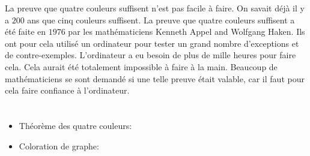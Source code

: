 {{La preuve que quatre couleurs suffisent n’est pas facile à faire. On savait déjà il y a $200$ ans que cinq couleurs suffisent. La preuve que quatre couleurs suffisent a été faite en $1976$ par les mathématiciens Kenneth Appel and Wolfgang Haken. Ils ont pour cela utilisé un ordinateur pour tester un grand nombre d’exceptions et de contre-exemples. L’ordinateur a eu besoin de plus de mille heures pour faire cela. Cela aurait été totalement impossible à faire à la main. Beaucoup de mathématiciens se sont demandé si une telle preuve était valable, car il faut pour cela faire confiance à l’ordinateur.



\section*{\BrochureWebsitesAndKeywords}
{\raggedright
\begin{itemize}
  \item Théorème des quatre couleurs: \href{https://fr.wikipedia.org/wiki/Th\%C3\%A9or\%C3\%A8me_des_quatre_couleurs}{}
  \item Coloration de graphe: \href{https://fr.wikipedia.org/wiki/Coloration_de_graphe}{}
\end{itemize}


}

}{}

}
